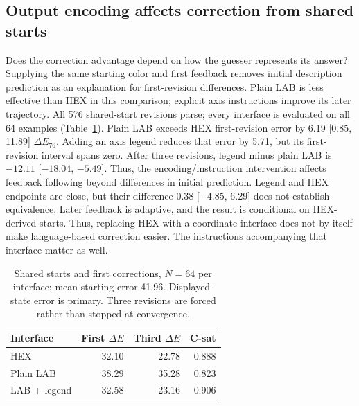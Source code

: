 \documentclass[11pt]{article}
\begin{document}
\subsection{Output encoding affects correction from shared starts}
\label{sec:results_interface}
Does the correction advantage depend on how the guesser represents its
answer? Supplying the same starting color and first feedback removes
initial description prediction as an explanation for first-revision
differences. Plain LAB is less effective than HEX in this comparison;
explicit axis instructions improve its later trajectory.
All 576 shared-start revisions parse; every interface is evaluated on all
64 examples (Table~\ref{tab:shared_interface}). Plain LAB exceeds HEX
first-revision error by 6.19 [0.85, 11.89] $\Delta E_{76}$.
Adding an axis legend reduces that error by 5.71, but its first-revision
interval spans zero. After three revisions, legend minus plain LAB is
$-12.11$ [$-18.04$, $-5.49$]. Thus, the encoding/instruction intervention
affects feedback following beyond differences in initial prediction.
Legend and HEX endpoints are close, but their difference 0.38
[$-4.85$, 6.29] does not establish equivalence. Later feedback is adaptive,
and the result is conditional on HEX-derived starts.
Thus, replacing HEX with a coordinate interface does not by itself make
language-based correction easier. The instructions accompanying that
interface matter as well.

\begin{table}[t]
\centering\small
\begin{tabular}{@{}lrrr@{}}
\toprule
Interface & First $\Delta E$ & Third $\Delta E$ & C-sat \\
\midrule
HEX & 32.10 & 22.78 & 0.888 \\
Plain LAB & 38.29 & 35.28 & 0.823 \\
LAB + legend & 32.58 & 23.16 & 0.906 \\
\bottomrule
\end{tabular}
\caption{Shared starts and first corrections, $N=64$ per interface;
mean starting error 41.96. Displayed-state error is primary. Three revisions
are forced rather than stopped at convergence.}
\label{tab:shared_interface}
\end{table}
\end{document}
